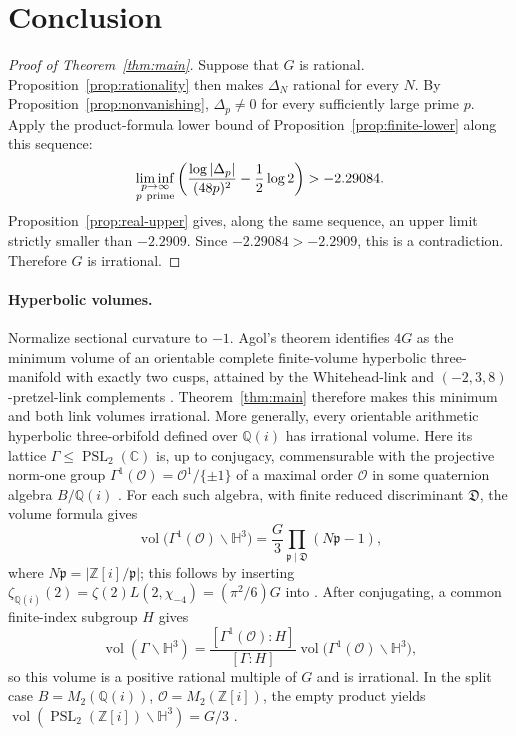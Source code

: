 \section{Conclusion}\label{sec:conclusion}

\begin{proof}[Proof of Theorem~\ref{thm:main}]
Suppose that $G$ is rational. Proposition~\ref{prop:rationality} then
makes $\Delta_N$ rational for every $N$.
By Proposition~\ref{prop:nonvanishing}, $\Delta_p\ne0$ for every
sufficiently large prime $p$. Apply the product-formula lower bound of
Proposition~\ref{prop:finite-lower} along this sequence:
\[
\liminf_{\substack{p\to\infty\\p\ {\rm prime}}}
\left(\frac{\log|\Delta_p|}{(48p)^2}-\frac12\log2\right)>-2.29084.
\]
Proposition~\ref{prop:real-upper} gives, along the same sequence, an
upper limit strictly smaller than $-2.2909$. Since
$-2.29084>-2.2909$, this is a contradiction. Therefore $G$ is irrational.
\end{proof}

\paragraph{Hyperbolic volumes.}
Normalize sectional curvature to $-1$. Agol's theorem identifies $4G$ as
the minimum volume of an orientable complete finite-volume hyperbolic
three-manifold with exactly two cusps, attained by the Whitehead-link
and $(-2,3,8)$-pretzel-link complements
\cite[Introduction and Theorem~3.6]{Agol2010TwoCusps}.
Theorem~\ref{thm:main} therefore makes this minimum and both link volumes
irrational. More generally, every orientable arithmetic hyperbolic
three-orbifold defined over $\mathbb Q(i)$ has irrational volume.
Here its lattice $\Gamma\le\operatorname{PSL}_2(\mathbb C)$ is,
up to conjugacy, commensurable with the projective norm-one group
$\Gamma^1(\mathcal O)=\mathcal O^1/\{\pm1\}$ of a maximal order
$\mathcal O$ in some quaternion algebra $B/\mathbb Q(i)$
\cite[Definition~38.3.4]{Voight2021Quaternion}.
For each such algebra, with finite reduced discriminant $\mathfrak D$,
the volume formula gives
\[
\operatorname{vol}\bigl(\Gamma^1(\mathcal O)\backslash\mathbb H^3\bigr)
 =\frac{G}{3}\prod_{\mathfrak p\mid\mathfrak D}(N\mathfrak p-1),
\]
where $N\mathfrak p=|\mathbb Z[i]/\mathfrak p|$; this follows by inserting
$\zeta_{\mathbb Q(i)}(2)=\zeta(2)L(2,\chi_{-4})=(\pi^2/6)G$
into \cite[Theorem~39.1.13]{Voight2021Quaternion}.
After conjugating, a common finite-index subgroup $H$ gives
\[
\operatorname{vol}(\Gamma\backslash\mathbb H^3)
 =\frac{[\Gamma^1(\mathcal O):H]}{[\Gamma:H]}
   \operatorname{vol}\bigl(\Gamma^1(\mathcal O)\backslash\mathbb H^3\bigr),
\]
so this volume is a positive rational multiple of $G$ and is irrational.
In the split case $B=M_2(\mathbb Q(i))$, $\mathcal O=M_2(\mathbb Z[i])$,
the empty product yields
$\operatorname{vol}(\operatorname{PSL}_2(\mathbb Z[i])\backslash\mathbb H^3)=G/3$
\cite[Example~39.1.16]{Voight2021Quaternion}.
